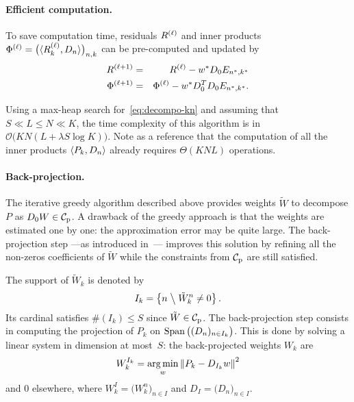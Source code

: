 \paragraph{Efficient computation.}

To save computation time, residuals $R^{\left(\ell\right)}$ and inner products
  $\Phi^{\left(\ell\right)} = \big( \langle R_k^{\left(\ell\right)},D_n \rangle \big)_{n,k}$
can be pre-computed and updated by
\begin{eqnarray}
  \label{eq:decompo-next-residual}
  R^{\left(\ell+1\right)} &=& R^{\left(\ell\right)} - w^* D_0 E_{n^*,k^*} \\
  \label{eq:decompo-next-dotprod}
  \Phi^{\left(\ell+1\right)} &=& \Phi^{\left(\ell\right)} - w^* D_0^T D_0 E_{n^*,k^*}.
\end{eqnarray}

Using a max-heap search for~\eqref{eq:decompo-kn} and assuming that $S\ll L\leq N\ll K$, the time complexity of this algorithm is in $\mathcal{O}\big(KN(L+\lambda S\log K)\big)$.
Note as a reference that the computation of all the inner products $\langle P_k,D_n \rangle$ already requires $\Theta(KNL)$ operations.


\paragraph{Back-projection.}

The iterative greedy algorithm described above provides weights $\tilde{W}$ to decompose $P$ as $D_0 W\in{\mathcal{C}_{\mathrm{p}}}$.
A drawback of the greedy approach is that the weights are estimated one by one: the approximation error may be quite large.
The back-projection step ---as introduced in~\cite{mallat1993matching}--- improves this solution by refining all the non-zeros coefficients of $\tilde{W}$ while the constraints from ${\mathcal{C}_{\mathrm{p}}}$ are still satisfied.

The support of $\tilde{W}_k$ is denoted by
\begin{equation}
  I_k=\left\{n \mathrel{}\middle\backslash\mathrel{} \tilde{W}_k^n\neq 0\right\}.
\end{equation}
Its cardinal satisfies $\#(I_k)\leq S$ since $\tilde{W}\in{\mathcal{C}_{\mathrm{p}}}$.
The back-pro\-jec\-tion step consists in computing the projection of $P_k$ on $\operatorname*{Span}\big((D_n)_{n\in I_k}\big)$.
This is done by solving a linear system in dimension at most~$S$: the back-projected weights $W_k$ are
\begin{equation}
  \label{eq:back-projection}
  W_k^{I_k}=\operatorname*{arg\,min}_w \left\|P_k - D_{I_k} w\right\|^2
\end{equation}
and $0$ elsewhere, where $W_k^I = \big(W_k^n\big)_{n\in I}$ and $D_I = \big(D_n\big)_{n\in I}$.


